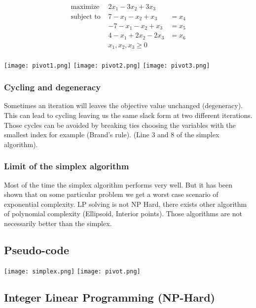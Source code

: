 \begin{eqnarray*}
    \textrm{maximize } & 2x_1 - 3x_2 + 3x_3\\
    \textrm{subject to } &  7 - x_1 - x_2 + x_3  & = x_4 \\
                         &  -7 - x_1 - x_2 + x_3 & = x_5  \\
                         &  4 - x_1 + 2x_2 - 2x_3 & = x_6  \\
                         & x_1, x_2, x_3  \geq 0\\
\end{eqnarray*}


\texttt{[image: pivot1.png]}
\texttt{[image: pivot2.png]}
\texttt{[image: pivot3.png]}

\subsubsection{Cycling and degeneracy}

Sometimes an iteration will leaves the objective value unchanged
(degeneracy). This can lead to cycling leaving us the same slack form at
two different iterations. Those cycles can be avoided by breaking ties
choosing the variables with the smallest index for example (Brand's
rule). (Line 3 and 8 of the simplex algorithm).

\subsubsection{Limit of the simplex algorithm}

Most of the time the simplex algorithm performs very well. But it has
been shown that on some particular problem we get a worst case scenario
of exponential complexity. LP solving is not NP Hard, there exists other
algorithm of polynomial complexity (Ellipsoid, Interior points). Those
algorithms are not necessarily better than the simplex.

\subsection{Pseudo-code}

\texttt{[image: simplex.png]}
\texttt{[image: pivot.png]}

\subsection{Integer Linear Programming (NP-Hard)}

